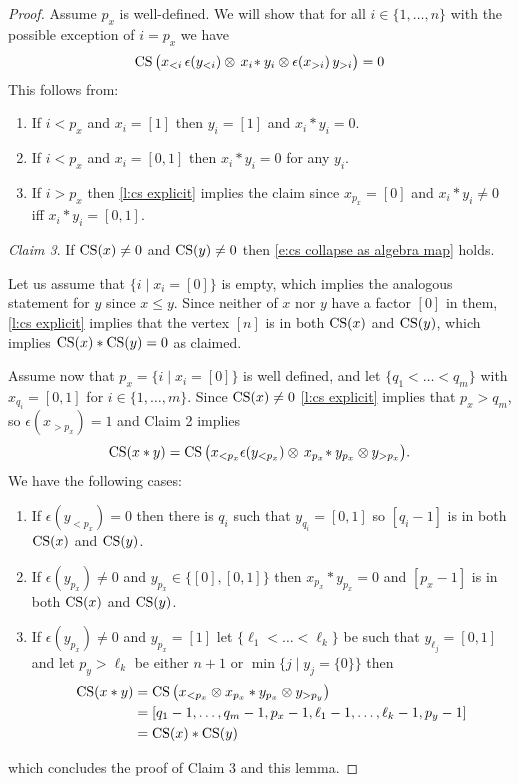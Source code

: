 \begin{proof}
	Assume $p_x$ is well-defined.
	We will show that for all $i \in \{1,\dots,n\}$ with the possible exception of $i = p_x$ we have
	\begin{equation} \label{e:case main lemma third claim}
		\operatorname{CS} \big( x_{<i} \, \epsilon(y_{<i}) \otimes \, x_{i} \! \ast y_{i} \otimes \epsilon(x_{>i}) \, y_{>i} \big) = 0
	\end{equation}
	This follows from:
	\begin{enumerate}
		\item If $i < p_x$ and $x_i = [1]$ then $y_i = [1]$ and $x_i \ast y_i = 0$.
		\item If $i < p_x$ and $x_i = [0,1]$ then $x_i \ast y_i = 0$ for any $y_i$.
		\item If $i > p_x$ then \cref{l:cs explicit} implies the claim since $x_{p_x} = [0]$ and $x_i \ast y_i \neq 0$ iff $x_i \ast y_i = [0,1]$.
	\end{enumerate}

	\noindent \textit{Claim 3}.
	If $\operatorname{CS}(x) \neq 0$ and $\operatorname{CS}(y) \neq 0$ then \eqref{e:cs collapse as algebra map} holds.

	Let us assume that $\big\{ i \mid x_i = [0] \big\}$ is empty, which implies the analogous statement for $y$ since $x \leq y$.
	Since neither of $x$ nor $y$ have a factor $[0]$ in them, \cref{l:cs explicit} implies that the vertex $[n]$ is in both $\operatorname{CS}(x)$ and $\operatorname{CS}(y)$, which implies $\operatorname{CS}(x) \ast \operatorname{CS}(y) = 0$ as claimed.

	Assume now that $p_x = \big\{ i \mid x_i = [0] \big\}$ is well defined, and let $\{q_1 < \dots < q_m\}$ with $x_{q_i} = [0,1]$ for $i \in \{1,\dots,m\}$.
	Since $\operatorname{CS}(x) \neq 0$ \cref{l:cs explicit} implies that $p_x > q_m$, so $\epsilon(x_{>p_x}) = 1$ and Claim 2 implies
	\[
	\operatorname{CS}(x \ast y) =
	\operatorname{CS} \big( x_{<p_x} \epsilon(y_{<p_x}) \otimes \, x_{p_x} \! \ast y_{p_x} \otimes y_{>p_x} \big).
	\]
	We have the following cases:
	\begin{enumerate}
		\item If $\epsilon(y_{<p_x}) = 0$ then there is $q_i$ such that $y_{q_i} = [0,1]$ so $[q_i-1]$ is in both $\operatorname{CS}(x)$ and $\operatorname{CS}(y)$.
		\item If $\epsilon(y_{p_x}) \neq 0$ and $y_{p_x} \in \{[0], [0,1]\}$ then $x_{p_x} \ast y_{p_x} = 0$ and $[p_x-1]$ is in both $\operatorname{CS}(x)$ and $\operatorname{CS}(y)$.
		\item If $\epsilon(y_{p_x}) \neq 0$ and $y_{p_x} = [1]$ let $\{\ell_1 < \dots < \ell_k\}$ be such that $y_{\ell_j} = [0,1]$ and let $p_y > \ell_k$ be either $n+1$ or $\min\{j \mid y_j = \{0\}\}$ then
		\begin{align*}
			\operatorname{CS}(x \ast y) & =
			\operatorname{CS} \big( x_{< p_x} \otimes x_{p_x} \ast y_{p_x} \otimes y_{> p_y} \big) \\ & =
			[q_1-1, \dots, q_m-1, p_x-1, \ell_1-1, \dots, \ell_k-1, p_y-1] \\ & =
			\operatorname{CS}(x) \ast \operatorname{CS}(y)
		\end{align*}
	\end{enumerate}
	which concludes the proof of Claim 3 and this lemma.
\end{proof}


